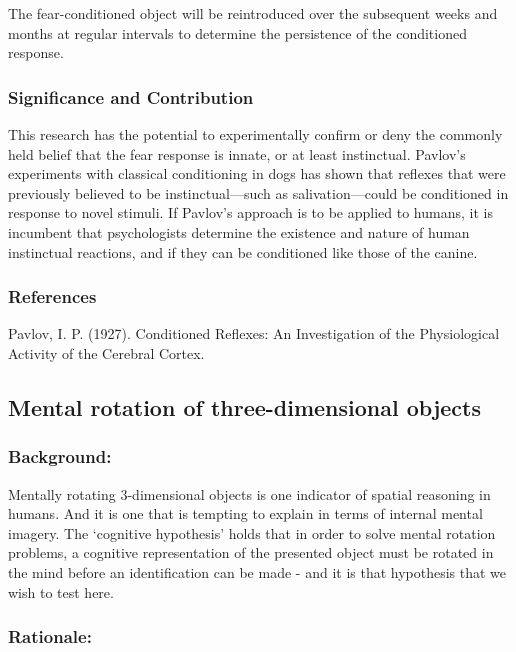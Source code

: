 The fear-conditioned object will be reintroduced over the subsequent weeks and months at regular intervals to determine the persistence of the conditioned response. 

\subsubsection{Significance and Contribution}
\label{significanceandcontribution}

This research has the potential to experimentally confirm or deny the commonly held belief that the fear response is innate, or at least instinctual. Pavlov's experiments with classical conditioning in dogs has shown that reflexes that were previously believed to be instinctual—such as salivation—could be conditioned in response to novel stimuli. If Pavlov's approach is to be applied to humans, it is incumbent that psychologists determine the existence and nature of human instinctual reactions, and if they can be conditioned like those of the canine.

\subsubsection{References}
\label{references}

Pavlov, I. P. (1927). Conditioned Reflexes: An Investigation of the Physiological Activity of the Cerebral Cortex. 

\subsection{Mental rotation of three-dimensional objects}
\label{mentalrotationofthree-dimensionalobjects}

\subsubsection{Background:}
\label{background:}

Mentally rotating 3-dimensional objects is one indicator of spatial reasoning in humans. And it is one that is tempting to explain in terms of internal mental imagery. The `cognitive hypothesis' holds that in order to solve mental rotation problems, a cognitive representation of the presented object must be rotated in the mind before an identification can be made - and it is that hypothesis that we wish to test here.

\subsubsection{Rationale:}
\label{rationale:}

